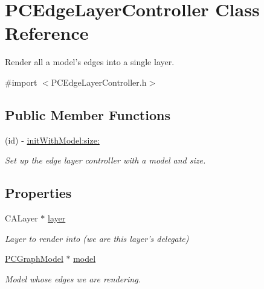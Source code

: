 \hypertarget{interface_p_c_edge_layer_controller}{
\section{PCEdgeLayerController Class Reference}
\label{interface_p_c_edge_layer_controller}
}


Render all a model's edges into a single layer.  




{\ttfamily \#import $<$PCEdgeLayerController.h$>$}

\subsection*{Public Member Functions}
\begin{DoxyCompactItemize}
\item 
\hypertarget{interface_p_c_edge_layer_controller_ad117b8e015628f52b6e4b264cce9cccd}{
(id) -\/ \hyperlink{interface_p_c_edge_layer_controller_ad117b8e015628f52b6e4b264cce9cccd}{initWithModel:size:}}
\label{interface_p_c_edge_layer_controller_ad117b8e015628f52b6e4b264cce9cccd}

\begin{DoxyCompactList}\small\item\em Set up the edge layer controller with a model and size. \end{DoxyCompactList}\end{DoxyCompactItemize}
\subsection*{Properties}
\begin{DoxyCompactItemize}
\item 
\hypertarget{interface_p_c_edge_layer_controller_ad6671853b1ae00bee3edcd338d395a24}{
CALayer $\ast$ \hyperlink{interface_p_c_edge_layer_controller_ad6671853b1ae00bee3edcd338d395a24}{layer}}
\label{interface_p_c_edge_layer_controller_ad6671853b1ae00bee3edcd338d395a24}

\begin{DoxyCompactList}\small\item\em Layer to render into (we are this layer's delegate) \end{DoxyCompactList}\item 
\hypertarget{interface_p_c_edge_layer_controller_aa7602cbe2a85d925138f1c8fbae12417}{
\hyperlink{interface_p_c_graph_model}{PCGraphModel} $\ast$ \hyperlink{interface_p_c_edge_layer_controller_aa7602cbe2a85d925138f1c8fbae12417}{model}}
\label{interface_p_c_edge_layer_controller_aa7602cbe2a85d925138f1c8fbae12417}

\begin{DoxyCompactList}\small\item\em Model whose edges we are rendering. \end{DoxyCompactList}\end{DoxyCompactItemize}


